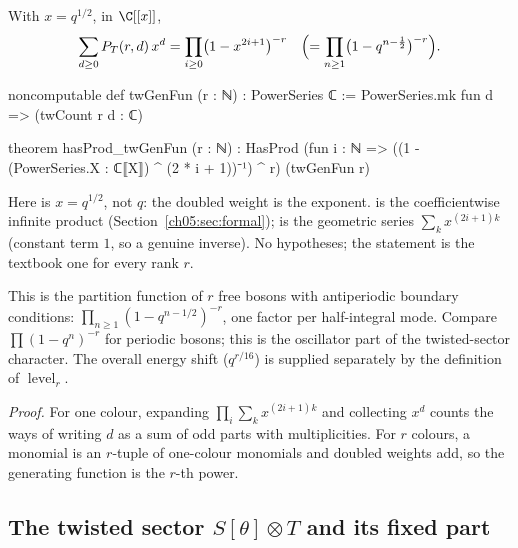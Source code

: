 \begin{theorem}\label{ch05:thm:twgen}
With $x = q^{1/2}$, in $\C[[x]]$,
\begin{equation*}
  \sum_{d\ge0}P_T(r,d)\,x^d = \prod_{i\ge0}\bigl(1 - x^{2i+1}\bigr)^{-r}
  \quad\Bigl(= \prod_{n\ge1}\bigl(1-q^{n-\frac12}\bigr)^{-r}\Bigr).
\end{equation*}
\end{theorem}
\begin{leancode}
noncomputable def twGenFun (r : ℕ) : PowerSeries ℂ := PowerSeries.mk fun d => (twCount r d : ℂ)

theorem hasProd_twGenFun (r : ℕ) :
    HasProd (fun i : ℕ => ((1 - (PowerSeries.X : ℂ⟦X⟧) ^ (2 * i + 1))⁻¹) ^ r) (twGenFun r)
\end{leancode}
\begin{dictionary}
Here  is $x = q^{1/2}$, not $q$: the doubled weight is the exponent.  is the
coefficientwise infinite product (Section~\ref{ch05:sec:formal});  is the
geometric series $\sum_kx^{(2i+1)k}$ (constant term $1$, so a genuine inverse). No hypotheses; the
statement is the textbook one for every rank $r$.
\end{dictionary}

\begin{physics}
This is the partition function of $r$ free bosons with antiperiodic boundary conditions: $\prod_{n\ge1}(1-q^{n-1/2})^{-r}$, one factor per half-integral mode. Compare $\prod(1-q^n)^{-r}$ for periodic bosons; this is the oscillator part of the twisted-sector character. The overall energy shift ($q^{r/16}$) is supplied separately by the definition of $\operatorname{level}_r$.
\end{physics}
\noindent\emph{Proof.} For one colour, expanding $\prod_i\sum_k x^{(2i+1)k}$ and collecting $x^d$ counts
the ways of writing $d$ as a sum of odd parts with multiplicities. For $r$ colours, a monomial is an
$r$-tuple of one-colour monomials and doubled weights add, so the generating function is the $r$-th
power.

\subsection{The twisted sector \texorpdfstring{$S[\theta]\otimes T$}{S[theta] (x) T} and its fixed part}

